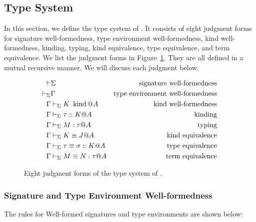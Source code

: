 \subsection{Type System}

In this section, we define the type system of \LMD.  It consists of eight
judgment forms for signature well-formedness, type environment well-formedness,
kind well-formedness, kinding, typing, kind equivalence, type equivalence, and
term equivalence.  We list the judgment forms in
Figure~\ref{fig:LMD-six-judgments}.  They are all defined in a mutual recursive
manner.  We will discuss each judgment below.

\begin{figure}[tbp]
    \begin{center}
    \begin{align*}
      \vdash & \Sigma                     & \text{signature well-formedness}        \\
      \vdash_\Sigma     & \Gamma                         & \text{type environment well-formedness} \\
      \Gamma     & \vdash_\Sigma K \operatorname{\ kind} @ A           & \text{kind well-formedness}             \\
      \Gamma     & \vdash_\Sigma \tau :: K @ A           & \text{kinding}                          \\
      \Gamma     & \vdash_\Sigma M : \tau @ A            & \text{typing}                           \\
      \Gamma     & \vdash_\Sigma K \equiv J @ A              & \text{kind equivalence}                 \\
      \Gamma     & \vdash_\Sigma \tau \equiv \sigma :: K @ A & \text{type equivalence}                 \\
      \Gamma     & \vdash_\Sigma M \equiv N : \tau @ A       & \text{term equivalence}
    \end{align*}
    \caption{Eight judgment forms of the type system of \LMD.}
    \label{fig:LMD-six-judgments}
  \end{center}
\end{figure}

\subsubsection{Signature and Type Environment Well-formedness}
The rules for Well-formed signatures and type environments are
shown below:
%
{\small
\begin{center}
  \infrule{
  }{
    \vdash \emptyset
  }
  \hfil
  \hfil
  \\[2mm]
  \infrule{
  }{
    \V \emptyset
  }
  \hfil
\end{center}
}

